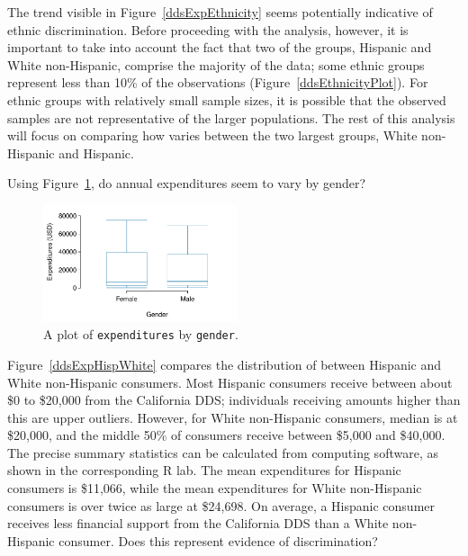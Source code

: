 The trend visible in Figure~\ref{ddsExpEthnicity} seems potentially indicative of ethnic discrimination. Before proceeding with the analysis, however, it is important to take into account the fact that two of the groups, Hispanic and White non-Hispanic, comprise the majority of the data; some ethnic groups represent less than 10\% of the observations (Figure~\ref{ddsEthnicityPlot}). For ethnic groups with relatively small sample sizes, it is possible that the observed samples are not representative of the larger populations. The rest of this analysis will focus on comparing how  varies between the two largest groups, White non-Hispanic and Hispanic. 

\begin{exercisewrap}
\begin{nexercise}
Using Figure~\ref{ddsExpGender}, do annual expenditures seem to vary by gender?\footnotemark{}
\end{nexercise}
\end{exercisewrap}

\begin{figure}[h]
	\centering
	\includegraphics[width=0.51\textwidth]{ch_intro_to_data_oi_biostat/figures/ddsExpGender/ddsExpGender}
	\caption{A plot of \texttt{expenditures} by \texttt{gender}. }
	\label{ddsExpGender}
\end{figure}

\textD{\newpage}

Figure~\ref{ddsExpHispWhite} compares the distribution of  between Hispanic and White non-Hispanic consumers. Most Hispanic consumers receive between about \$0 to \$20,000 from the California DDS; individuals receiving amounts higher than this are upper outliers. However, for White non-Hispanic consumers, median  is at \$20,000, and the middle 50\% of consumers receive between \$5,000 and \$40,000. The precise summary statistics can be calculated from computing software, as shown in the corresponding \textsf{R} lab. The mean expenditures for Hispanic consumers is \$11,066, while the mean expenditures for White non-Hispanic consumers is over twice as large at \$24,698. On average, a Hispanic consumer receives less financial support from the California DDS than a White non-Hispanic consumer. Does this represent evidence of discrimination?

